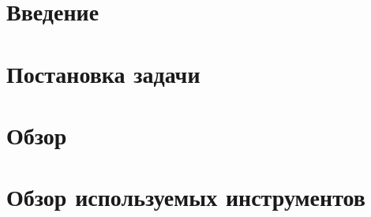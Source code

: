 




\usepackage{totcount}

\usepackage{caption}
\usepackage{listings}




\maketitle
\setcounter{tocdepth}{2}
\tableofcontents


\section*{Введение}


\section{Постановка задачи}


\section{Обзор}


\section{Обзор используемых инструментов}





